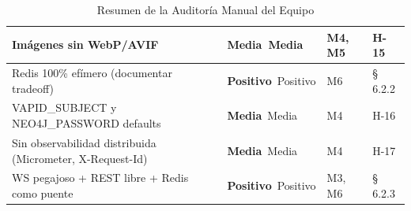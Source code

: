 \documentclass[10pt,a4paper]{article}
\newcommand{\badgeMedia}{\colorbox{yellow!35}{\textcolor{brown!90!black}{\textbf{\footnotesize Media}}}}
\newcommand{\badgePositivo}{\colorbox{green!20}{\textcolor{green!60!black}{\textbf{\footnotesize Positivo}}}}
\begin{document}
\begin{table}[htbp]
\begin{tabularx}{\textwidth}{X p{2.2cm} p{1.5cm} p{2.5cm}}
Imágenes sin WebP/AVIF & \badgeMedia\  Media & M4, M5 & H-15 \\ \midrule
Redis 100\% efímero (documentar tradeoff) & \badgePositivo\  Positivo & M6 & \S\,6.2.2 \\ \midrule
VAPID\_SUBJECT y NEO4J\_PASSWORD defaults & \badgeMedia\  Media & M4 & H-16 \\ \midrule
Sin observabilidad distribuida (Micrometer, X-Request-Id) & \badgeMedia\  Media & M4 & H-17 \\ \midrule
WS pegajoso + REST libre + Redis como puente & \badgePositivo\  Positivo & M3, M6 & \S\,6.2.3 \\ \midrule
\bottomrule
\end{tabularx}
\caption{Resumen de la Auditoría Manual del Equipo}
\end{table}
\end{document}
